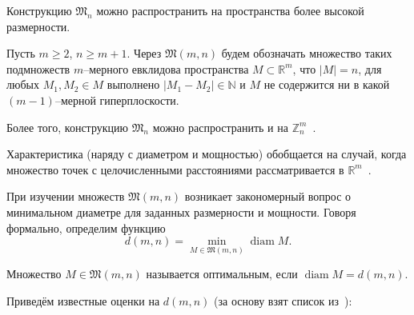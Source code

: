 Конструкцию $\mathfrak{M}_n$ можно распространить на пространства более высокой размерности.


\begin{definition}
	Пусть $m \geq 2$, $n \geq m + 1$.
	Через $\mathfrak{M}(m,n)$ будем обозначать множество таких подмножеств $m$--мерного евклидова пространства
	$M\subset\mathbb{R}^m$, что $|M| = n$, для любых $M_1,M_2 \in M$ выполнено $|M_1 - M_2| \in\mathbb{N}$
	и $M$ не содержится ни в какой $(m-1)$--мерной гиперплоскости.
\end{definition}

Более того, конструкцию $\mathfrak{M}_n$ можно распространить и на $\mathbb{Z}^m_n$~\cite{Kohnert2006IntegralPS}.

Характеристика (наряду с диаметром и мощностью) обобщается на случай, когда множество точек с целочисленными расстояниями
рассматривается в $\mathbb{R}^m$~\cite{kurz2005characteristic}.

При изучении множеств $\mathfrak{M}(m,n)$ возникает закономерный вопрос
о минимальном диаметре для заданных размерности и мощности.
Говоря формально, определим функцию
\begin{equation*}
	d(m,n) = \min_{M\in\mathfrak{M}(m,n)} \operatorname{diam} M
	.
\end{equation*}

\begin{definition}
	Множество $M\in\mathfrak{M}(m,n)$ называется оптимальным,
	если $\operatorname{diam} M = d(m,n)$.
\end{definition}

Приведём известные оценки на $d(m,n)$
(за основу взят список из~\cite{kurz2008bounds}):


